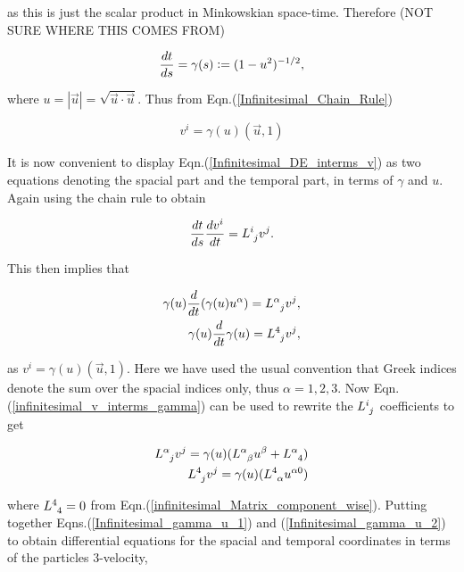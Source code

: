 \noindent as this is just the scalar product in Minkowskian space-time. Therefore (NOT SURE WHERE THIS COMES FROM)

\begin{equation*}
\frac{dt}{ds} = \gamma (s) \vcentcolon = (1-u^2)^{-1/2},
\end{equation*}

\noindent where $u = |\vec{u}| = \sqrt{\vec{u} \cdot \vec{u}}$. Thus from Eqn.(\ref{Infinitesimal_Chain_Rule})

\begin{equation}\label{infinitesimal_v_interms_gamma}
v^i = \gamma(u) (\vec{u}, 1)
\end{equation}

\noindent It is now convenient to display Eqn.(\ref{Infinitesimal_DE_interms_v}) as two equations denoting the spacial part and the temporal part, in terms of $\gamma$ and $u$. Again using the chain rule to obtain

\begin{equation*} 
\frac{dt}{ds} \frac{dv^i}{dt} = \tensor{L}{^{i}_{j}}v^j. 
\end{equation*} 

\noindent This then implies that 

\begin{eqnarray}\label{Infinitesimal_gamma_u_1}
\gamma(u) \frac{d}{dt} (\gamma(u) u^{\alpha}) = \tensor{L}{^{\alpha}_{j}} v^j, \\\nonumber
\gamma(u) \frac{d}{dt} \gamma(u) = \tensor{L}{^{4}_{j}} v^j,
\end{eqnarray}

\noindent as $v^i = \gamma(u)(\vec{u},1)$. Here we have used the usual convention that Greek indices denote the sum over the spacial indices only, thus $\alpha = 1,2,3$. Now Eqn.(\ref{infinitesimal_v_interms_gamma}) can be used to rewrite the $\tensor{L}{^{i}_{j}}$ coefficients to get

\begin{eqnarray}\label{Infinitesimal_gamma_u_2}
\tensor{L}{^{\alpha}_{j}} v^j = \gamma(u) (\tensor{L}{^{\alpha}_{\beta}} u^{\beta} + \tensor{L}{^{\alpha}_4}) \\ \nonumber
\tensor{L}{^{4}_{j}} v^j = \gamma(u) (\tensor{L}{^{4}_{\alpha}} u^{\alpha0})
\end{eqnarray} 

\noindent where $\tensor{L}{^{4}_{4}} = 0$ from Eqn.(\ref{infinitesimal_Matrix_component_wise}). Putting together Eqns.(\ref{Infinitesimal_gamma_u_1}) and (\ref{Infinitesimal_gamma_u_2}) to obtain differential equations for the spacial and temporal coordinates in terms of the particles $3$-velocity,

